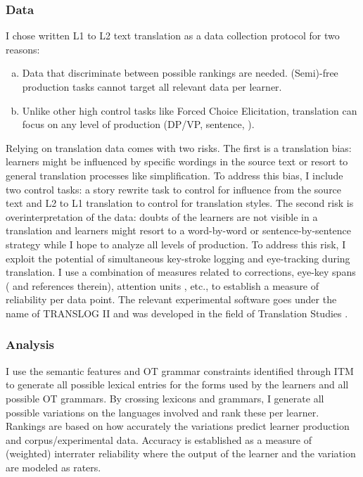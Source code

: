 \documentclass[output=paper,
modfonts
]{langscibook}
\begin{document}
\subsubsection{Data}

I chose written L1 to L2 text translation as a data collection protocol for two reasons:

\begin{enumerate}[(a)]
\item Data that discriminate between possible rankings are needed. (Semi)-free production tasks cannot target all relevant data per learner.
\item Unlike other high control tasks like Forced Choice Elicitation, translation can focus on any level of production (DP/VP, sentence, ).
\end{enumerate}


Relying on translation data comes with two risks. The first is a translation bias: learners might be influenced by specific wordings in the source text or resort to general translation processes like simplification. To address this bias, I include two control tasks: a story rewrite task to control for influence from the source text and L2 to L1 translation to control for translation styles. The second risk is overinterpretation of the data: doubts of the learners are not visible in a translation and learners might resort to a word-by-word or sentence-by-sentence strategy while I hope to analyze all levels of production. To address this risk, I exploit the potential of simultaneous key-stroke logging and eye-tracking during translation. I use a combination of measures related to corrections, eye-key spans (\citealt{Timarovaetal2011} and references therein), attention units \citep[e.g.][]{Hvelplund2016}, etc., to establish a measure of reliability per data point. The relevant experimental software goes under the name of TRANSLOG II and was developed in the field of Translation Studies \citep{SchwieterFerreira2017}.

\subsubsection{Analysis}

I use the semantic features and OT grammar constraints identified through ITM to generate all possible lexical entries for the forms used by the learners and all possible OT grammars. By crossing lexicons and grammars, I generate all possible variations on the languages involved and rank these per learner. Rankings are based on how accurately the variations predict learner production and corpus/experimental data. Accuracy is established as a measure of (weighted) interrater reliability where the output of the learner and the variation are modeled as raters.
\end{document}
